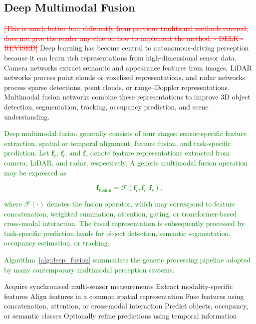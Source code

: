 \documentclass{ieeeaccess}
\newcommand{\deleted}[1]{\textcolor{red}{\sout{#1}}}
\begin{document}
\subsection{Deep Multimodal Fusion}
\deleted{[This is much better but, differently from previous traditional methods covered, does not give the reader any clue on how to implement the method. - DELK - REVISED]}
Deep learning has become central to autonomous-driving perception because it can learn rich representations from high-dimensional sensor data. Camera networks extract semantic and appearance features from images, LiDAR networks process point clouds or voxelised representations, and radar networks process sparse detections, point clouds, or range--Doppler representations. Multimodal fusion networks combine these representations to improve 3D object detection, segmentation, tracking, occupancy prediction, and scene understanding.

\textcolor{green}{Deep multimodal fusion generally consists of four stages: sensor-specific feature extraction, spatial or temporal alignment, feature fusion, and task-specific prediction. Let $\mathbf{f}_c$, $\mathbf{f}_l$, and $\mathbf{f}_r$ denote feature representations extracted from camera, LiDAR, and radar, respectively. A generic multimodal fusion operation may be expressed as}

\textcolor{green}{
\begin{equation}
\mathbf{f}_{\mathrm{fusion}}
=
\mathcal{F}
\left(
\mathbf{f}_c,
\mathbf{f}_l,
\mathbf{f}_r
\right),
\label{eq:deep_fusion}
\end{equation}
}

\textcolor{green}{where $\mathcal{F}(\cdot)$ denotes the fusion operator, which may correspond to feature concatenation, weighted summation, attention, gating, or transformer-based cross-modal interaction. The fused representation is subsequently processed by task-specific prediction heads for object detection, semantic segmentation, occupancy estimation, or tracking.
}

\textcolor{green}{Algorithm~\ref{alg:deep_fusion} summarises the generic processing pipeline adopted by many contemporary multimodal perception systems.}

\begin{algorithm}[t]
\caption{Generic Deep Multimodal Fusion Pipeline}
\label{alg:deep_fusion}
\begin{algorithmic}[1]
\State Acquire synchronised multi-sensor measurements
\State Extract modality-specific features
\State Align features in a common spatial representation
\State Fuse features using concatenation, attention, or cross-modal interaction
\State Predict objects, occupancy, or semantic classes
\State Optionally refine predictions using temporal information
\end{algorithmic}
\end{algorithm}
\end{document}
